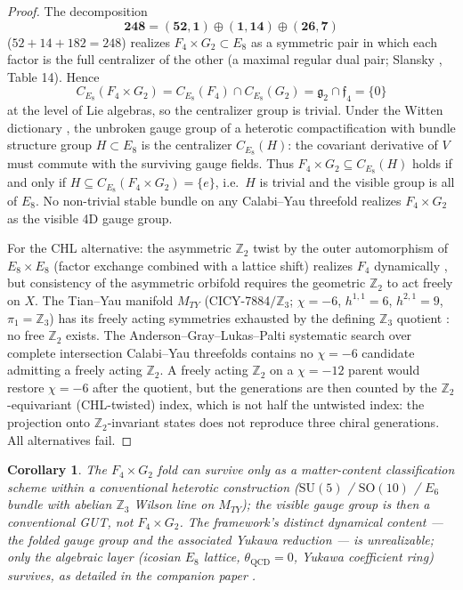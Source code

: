 \documentclass[11pt,a4paper]{amsart}
\newtheorem*{maincorollary}{Corollary}
\theoremstyle{definition}
\theoremstyle{remark}
\newcommand{\SU}{\mathrm{SU}}
\newcommand{\SO}{\mathrm{SO}}
\newcommand{\bbZ}{\mathbb{Z}}
\begin{document}
\begin{proof}
The decomposition
\[ \mathbf{248} = (\mathbf{52}, \mathbf{1}) \oplus (\mathbf{1},
   \mathbf{14}) \oplus (\mathbf{26}, \mathbf{7}) \]
($52 + 14 + 182 = 248$) realizes $F_4 \times G_2 \subset E_8$ as a
symmetric pair in which each factor is the full centralizer of the other
(a maximal regular dual pair; Slansky \cite{Slansky1981}, Table 14). Hence
\[ C_{E_8}(F_4 \times G_2) = C_{E_8}(F_4) \cap C_{E_8}(G_2)
   = \mathfrak{g}_2 \cap \mathfrak{f}_4 = \{0\} \]
at the level of Lie algebras, so the centralizer group is trivial. Under
the Witten dictionary \cite{Witten1985}, the unbroken gauge group of a
heterotic compactification with bundle structure group $H \subset E_8$ is
the centralizer $C_{E_8}(H)$: the covariant derivative of $V$ must commute
with the surviving gauge fields. Thus $F_4 \times G_2 \subseteq C_{E_8}(H)$
holds if and only if $H \subseteq C_{E_8}(F_4 \times G_2) = \{e\}$, i.e.\
$H$ is trivial and the visible group is all of $E_8$. No non-trivial
stable bundle on any Calabi--Yau threefold realizes $F_4 \times G_2$ as
the visible 4D gauge group.

For the CHL alternative: the asymmetric $\bbZ_2$ twist by the outer
automorphism of $E_8 \times E_8$ (factor exchange combined with a lattice
shift) realizes $F_4$ dynamically \cite{CHL1995, Polchinski1998}, but
consistency of the asymmetric orbifold requires the geometric $\bbZ_2$ to
act freely on $X$. The Tian--Yau manifold $M_{TY}$ (CICY-7884$/\bbZ_3$;
$\chi = -6$, $h^{1,1} = 6$, $h^{2,1} = 9$, $\pi_1 = \bbZ_3$)
\cite{TianYau1987} has its freely acting symmetries exhausted by the
defining $\bbZ_3$ quotient \cite{GKMR1986}: no free $\bbZ_2$ exists. The
Anderson--Gray--Lukas--Palti systematic search over complete intersection
Calabi--Yau threefolds \cite{AGLP2011} contains no $\chi = -6$ candidate
admitting a freely acting $\bbZ_2$. A freely acting $\bbZ_2$ on a
$\chi = -12$ parent would restore $\chi = -6$ after the quotient, but the
generations are then counted by the $\bbZ_2$-equivariant (CHL-twisted)
index, which is not half the untwisted index: the projection onto
$\bbZ_2$-invariant states does not reproduce three chiral generations.
All alternatives fail.
\end{proof}

\begin{maincorollary}
The $F_4 \times G_2$ fold can survive only as a matter-content
classification scheme within a conventional heterotic construction
($\SU(5)$ / $\SO(10)$ / $E_6$ bundle with abelian $\bbZ_3$ Wilson line on
$M_{TY}$); the visible gauge group is then a conventional GUT, not
$F_4 \times G_2$. The framework's distinct dynamical content --- the folded
gauge group and the associated Yukawa reduction --- is unrealizable; only
the algebraic layer (icosian $E_8$ lattice, $\theta_{\mathrm{QCD}} = 0$,
Yukawa coefficient ring) survives, as detailed in the companion paper
\cite{paper3}.
\end{maincorollary}
\end{document}

